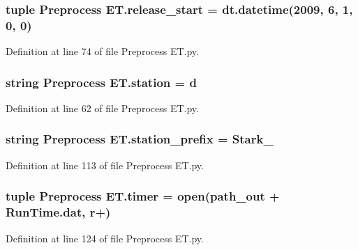 \hypertarget{namespace_preprocess_01_e_t_ab39b88edc6dd3541bec4573f18c49552}{}
\subsubsection[{release\+\_\+start}]{\setlength{\rightskip}{0pt plus 5cm}tuple Preprocess E\+T.\+release\+\_\+start = dt.\+datetime(2009, 6, 1, 0, 0)}\label{namespace_preprocess_01_e_t_ab39b88edc6dd3541bec4573f18c49552}


Definition at line 74 of file Preprocess E\+T.\+py.

\hypertarget{namespace_preprocess_01_e_t_ae4f8823553a121082c4f553685d82cc3}{}
\subsubsection[{station}]{\setlength{\rightskip}{0pt plus 5cm}string Preprocess E\+T.\+station = \textquotesingle{}d\textquotesingle{}}\label{namespace_preprocess_01_e_t_ae4f8823553a121082c4f553685d82cc3}


Definition at line 62 of file Preprocess E\+T.\+py.

\hypertarget{namespace_preprocess_01_e_t_aee0076efa8b1860288f3b74c5c621a04}{}
\subsubsection[{station\+\_\+prefix}]{\setlength{\rightskip}{0pt plus 5cm}string Preprocess E\+T.\+station\+\_\+prefix = \textquotesingle{}Stark\+\_\+\textquotesingle{}}\label{namespace_preprocess_01_e_t_aee0076efa8b1860288f3b74c5c621a04}


Definition at line 113 of file Preprocess E\+T.\+py.

\hypertarget{namespace_preprocess_01_e_t_ad5970f6891d846d79808f7d02dbc9f0e}{}
\subsubsection[{timer}]{\setlength{\rightskip}{0pt plus 5cm}tuple Preprocess E\+T.\+timer = open({\bf path\+\_\+out} + \textquotesingle{}Run\+Time.\+dat\textquotesingle{}, \textquotesingle{}r+\textquotesingle{})}\label{namespace_preprocess_01_e_t_ad5970f6891d846d79808f7d02dbc9f0e}


Definition at line 124 of file Preprocess E\+T.\+py.

